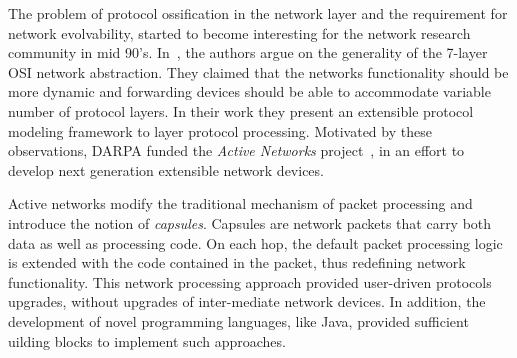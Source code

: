The problem of protocol ossification in the network layer and the requirement
for network evolvability, started to become interesting for the network research
community
in mid 90's. In~\cite{O'Malley1992}, the authors argue on the generality of the
7-layer OSI network abstraction. They claimed that the networks functionality
should be more dynamic and forwarding devices should be able to accommodate
variable number of protocol layers. In their work they present an extensible protocol
modeling framework to layer protocol processing. Motivated by these observations, DARPA
funded the {\it Active Networks} project~\cite{darpa_active_net}, in an effort
to develop next generation extensible network devices. 

Active networks modify the traditional mechanism of packet processing and
introduce the notion of {\it capsules}. Capsules are network packets that carry both data
as well as processing code. On each hop, the default packet
processing logic is extended with the code contained in the packet, thus
redefining network functionality. This network processing approach provided
user-driven protocols upgrades, without upgrades of 
inter-mediate network devices.  In addition, the development of novel
programming languages, like Java, provided sufficient uilding blocks to implement such
approaches.  

